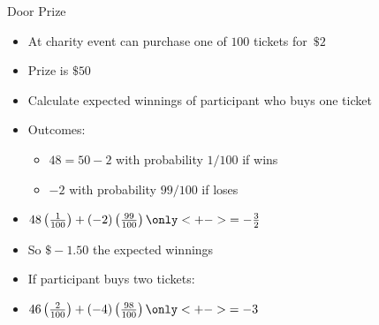 \documentclass[handout]{beamer}
\theoremstyle{definition}
\begin{document}
\begin{frame}{Door Prize}
\begin{itemize}
\item At charity event can purchase one of $100$ tickets for~$\$2$
\item Prize is $\$50$
\item Calculate expected winnings of participant who buys one ticket
\item Outcomes:
\begin{itemize}
\item $48=50-2$ with probability $1/100$ if wins
\item $-2$ with probability $99/100$ if loses
\end{itemize} 
\item $48\left(\frac{1}{100}\right)+\left(-2\right)
\left(\frac{99}{100}\right)
\only<+->{=-\frac{3}{2}}$
\item So $\$-1.50$ the expected winnings
\item If participant buys \alert{two} tickets:
\item $46\left(\frac{2}{100}\right)+\left(-4\right)
\left(\frac{98}{100}\right)
\only<+->{=-3}$
\end{itemize}
\end{frame}
\end{document}
